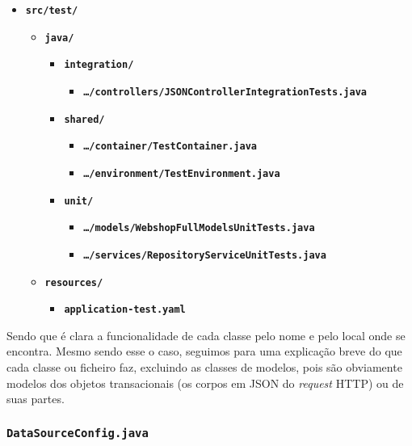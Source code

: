 \begin{itemize}
  \item \texttt{\textbf{src/test/}}\begin{itemize}
          \item \texttt{\textbf{java/}}\begin{itemize}
                  \item \texttt{\textbf{integration/}}\begin{itemize}
                          \item \texttt{\textbf{\ldots/controllers/JSONControllerIntegrationTests.java}}
                        \end{itemize}
                  \item \texttt{\textbf{shared/}}\begin{itemize}
                          \item \texttt{\textbf{\ldots/container/TestContainer.java}}
                          \item \texttt{\textbf{\ldots/environment/TestEnvironment.java}}
                        \end{itemize}
                  \item \texttt{\textbf{unit/}}\begin{itemize}
                          \item \texttt{\textbf{\ldots/models/WebshopFullModelsUnitTests.java}}
                          \item \texttt{\textbf{\ldots/services/RepositoryServiceUnitTests.java}}
                        \end{itemize}
                \end{itemize}
          \item \texttt{\textbf{resources/}}\begin{itemize}
                  \item \texttt{\textbf{application-test.yaml}}
                \end{itemize}
        \end{itemize}
\end{itemize}

Sendo que é clara a funcionalidade de cada classe pelo nome e pelo local onde se encontra. Mesmo sendo esse o caso, seguimos para uma explicação breve do que cada classe ou ficheiro faz, excluindo as classes de modelos, pois são obviamente modelos dos objetos transacionais (os corpos em JSON do \textit{request} HTTP) ou de suas partes.

\subsubsection*{\texttt{DataSourceConfig.java}}


